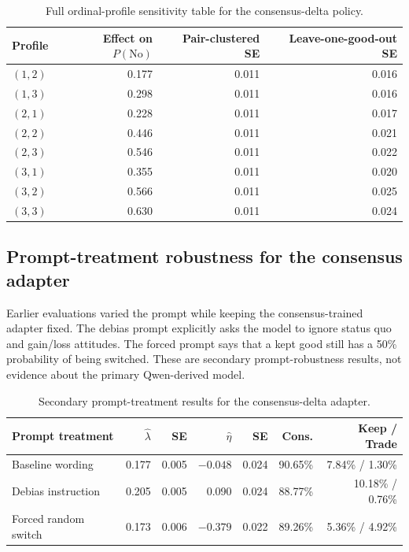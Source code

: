 \documentclass[11pt,letterpaper]{article}
\begin{document}
\begin{table}[htbp]
\centering
\small
\begin{tabular}{lrrr}
\toprule
Profile & Effect on $P(\mathrm{No})$ & Pair-clustered SE & Leave-one-good-out SE \\
\midrule
$(1,2)$ & 0.177 & 0.011 & 0.016 \\
$(1,3)$ & 0.298 & 0.011 & 0.016 \\
$(2,1)$ & 0.228 & 0.011 & 0.017 \\
$(2,2)$ & 0.446 & 0.011 & 0.021 \\
$(2,3)$ & 0.546 & 0.011 & 0.022 \\
$(3,1)$ & 0.355 & 0.011 & 0.020 \\
$(3,2)$ & 0.566 & 0.011 & 0.025 \\
$(3,3)$ & 0.630 & 0.011 & 0.024 \\
\bottomrule
\end{tabular}
\caption{Full ordinal-profile sensitivity table for the consensus-delta
policy.}
\label{tab:attribute-profiles}
\end{table}

\subsection{Prompt-treatment robustness for the consensus adapter}

Earlier evaluations varied the prompt while keeping the consensus-trained
adapter fixed. The debias prompt explicitly asks the model to ignore status
quo and gain/loss attitudes. The forced prompt says that a kept good still has
a 50\% probability of being switched. These are secondary prompt-robustness
results, not evidence about the primary Qwen-derived model.

\begin{table}[htbp]
\centering
\small
\begin{tabular}{lrrrrrr}
\toprule
Prompt treatment & $\widehat\lambda$ & SE & $\widehat\eta$ & SE & Cons. & Keep / Trade \\
\midrule
Baseline wording & 0.177 & 0.005 & $-0.048$ & 0.024 & 90.65\% & 7.84\% / 1.30\% \\
Debias instruction & 0.205 & 0.005 & 0.090 & 0.024 & 88.77\% & 10.18\% / 0.76\% \\
Forced random switch & 0.173 & 0.006 & $-0.379$ & 0.022 & 89.26\% & 5.36\% / 4.92\% \\
\bottomrule
\end{tabular}
\caption{Secondary prompt-treatment results for the consensus-delta adapter.}
\label{tab:treatments}
\end{table}
\end{document}
